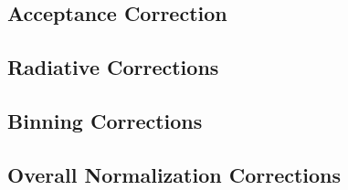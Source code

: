 \subsection{Acceptance Correction}

\subsection{Radiative Corrections}

\subsection{Binning Corrections}

\subsection{Overall Normalization Corrections}
